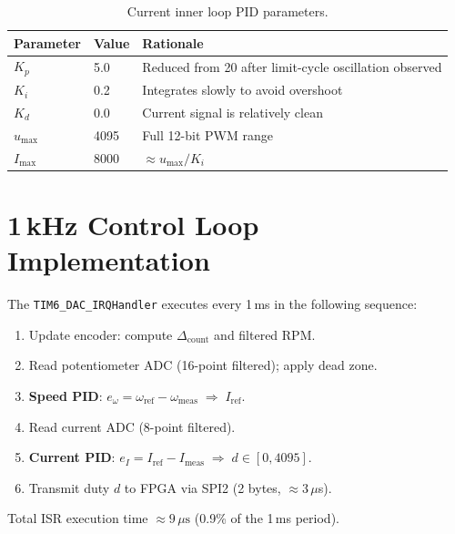 \documentclass[12pt, a4paper]{report}
\begin{document}
\begin{table}[H]
    \centering
    \caption{Current inner loop PID parameters.}
    \label{tab:current_pid}
    \begin{tabular}{lll}
        \toprule
        \textbf{Parameter} & \textbf{Value} & \textbf{Rationale} \\
        \midrule
        $K_p$ & 5.0  & Reduced from 20 after limit-cycle oscillation observed \\
        $K_i$ & 0.2  & Integrates slowly to avoid overshoot \\
        $K_d$ & 0.0  & Current signal is relatively clean \\
        $u_{\max}$ & 4095 & Full 12-bit PWM range \\
        $I_{\max}$ & 8000 & $\approx u_{\max}/K_i$ \\
        \bottomrule
    \end{tabular}
\end{table}

\section{1\,kHz Control Loop Implementation}

The \texttt{TIM6\_DAC\_IRQHandler} executes every 1\,ms in the following
sequence:

\begin{enumerate}
    \item Update encoder: compute $\Delta_{\text{count}}$ and filtered RPM.
    \item Read potentiometer ADC (16-point filtered); apply dead zone.
    \item \textbf{Speed PID}: $e_\omega = \omega_{\text{ref}} - \omega_{\text{meas}}
          \;\Rightarrow\; I_{\text{ref}}$.
    \item Read current ADC (8-point filtered).
    \item \textbf{Current PID}: $e_I = I_{\text{ref}} - I_{\text{meas}}
          \;\Rightarrow\; d \in [0, 4095]$.
    \item Transmit duty $d$ to FPGA via SPI2 (2 bytes, $\approx3\,\mu$s).
\end{enumerate}

Total ISR execution time $\approx 9\,\mu\text{s}$ (0.9\% of the 1\,ms period).

\end{document}
